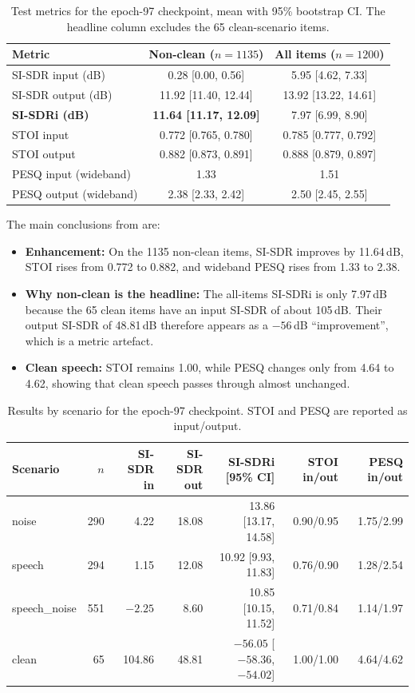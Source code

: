 \documentclass[11pt,a4paper]{article}
\newcommand{\sisdr}{SI-SDR}
\newcommand{\sisdri}{SI-SDRi}
\begin{document}
\begin{table}[htbp]
\centering\small
\caption{Test metrics for the epoch-97 checkpoint, mean with 95\% bootstrap CI. The headline
column excludes the 65 clean-scenario items.}
\label{tab:test}
\begin{tabular}{@{}lcc@{}}
\toprule
Metric & Non-clean ($n{=}1135$) & All items ($n{=}1200$)\\
\midrule
\sisdr{} input (dB) & 0.28 [0.00, 0.56] & 5.95 [4.62, 7.33]\\
\sisdr{} output (dB) & 11.92 [11.40, 12.44] & 13.92 [13.22, 14.61]\\
\textbf{\sisdri{} (dB)} & \textbf{11.64 [11.17, 12.09]} & 7.97 [6.99, 8.90]\\
STOI input & 0.772 [0.765, 0.780] & 0.785 [0.777, 0.792]\\
STOI output & 0.882 [0.873, 0.891] & 0.888 [0.879, 0.897]\\
PESQ input (wideband) & 1.33 & 1.51\\
PESQ output (wideband) & 2.38 [2.33, 2.42] & 2.50 [2.45, 2.55]\\
\bottomrule
\end{tabular}
\end{table}

The main conclusions from  are:
\begin{itemize}
  \item \textbf{Enhancement:} On the 1135 non-clean items, SI-SDR improves by 11.64\,dB,
        STOI rises from 0.772 to 0.882, and wideband PESQ rises from 1.33 to 2.38.
  \item \textbf{Why non-clean is the headline:} The all-items SI-SDRi is only 7.97\,dB because
        the 65 clean items have an input SI-SDR of about 105\,dB. Their output SI-SDR of 48.81\,dB
        therefore appears as a $-56$\,dB ``improvement'', which is a metric artefact.
  \item \textbf{Clean speech:} STOI remains 1.00, while PESQ changes only from 4.64 to 4.62,
        showing that clean speech passes through almost unchanged.
\end{itemize}

\begin{table}[htbp]
\centering\small
\caption{Results by scenario for the epoch-97 checkpoint. STOI and PESQ are reported as
input/output.}
\label{tab:scenario}
\begin{tabular}{@{}lrrrrrr@{}}
\toprule
Scenario & $n$ & \sisdr{} in & \sisdr{} out & \sisdri{} [95\% CI] & STOI in/out & PESQ in/out\\
\midrule
noise & 290 & 4.22 & 18.08 & 13.86 [13.17, 14.58] & 0.90/0.95 & 1.75/2.99\\
speech & 294 & 1.15 & 12.08 & 10.92 [9.93, 11.83] & 0.76/0.90 & 1.28/2.54\\
speech\_noise & 551 & $-2.25$ & 8.60 & 10.85 [10.15, 11.52] & 0.71/0.84 & 1.14/1.97\\
clean & 65 & 104.86 & 48.81 & $-56.05$ [$-58.36$, $-54.02$] & 1.00/1.00 & 4.64/4.62\\
\bottomrule
\end{tabular}
\end{table}
\end{document}
